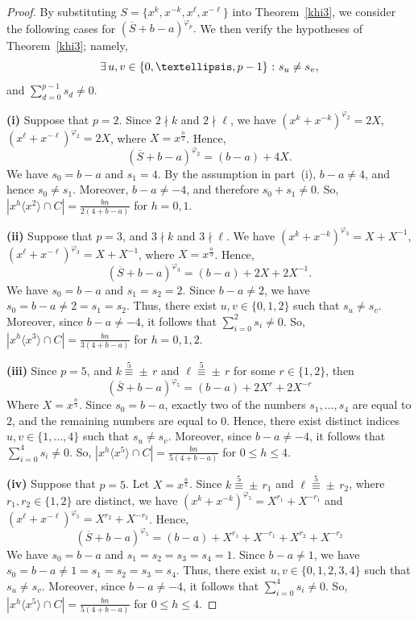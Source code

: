 \documentclass[10pt,a4paper]{amsart}
\begin{document}
\begin{proof}
	By substituting
	$
	S=\{x^k,x^{-k},x^\ell,x^{-\ell}\}
	$
	into Theorem~\ref{khi3}, we consider the following cases for
	$
	(\overline{S}+b-a)^{\varphi_p}.
	$ We then verify the hypotheses of Theorem~\ref{khi3}; namely,
		\begin{equation}\label{eq:susv2}
		\exists\,u,v\in\{0,\ldots,p-1\}\ \text : \ s_u \neq s_v, \end{equation}
	and $\sum_{d=0}^{p-1}s_d\neq0.$	
	
	\indent\textbf{(i)} Suppose that \(p=2\). Since $2\nmid k$ and $2\nmid \ell$, we have $(x^k+x^{-k})^{\varphi_2}=2X$,  $(x^\ell+x^{-\ell})^{\varphi_2}=2X$, where $X=x^\frac{n}{2}$. Hence,
	\[
	(\overline{S}+b-a)^{\varphi_2}=(b-a)+4X.
	\]
We have
$s_0=b-a$ and $s_1=4.$
By the assumption in part~(i), \(b-a\neq 4\), and hence
$s_0\neq s_1.$
Moreover, \(b-a\neq -4\), and therefore $s_0+s_1\neq 0.$ So,
$
\left|x^h\langle x^2\rangle\cap C\right|
=
\frac{bn}{2(4+b-a)}$ for $h=0,1.$

\indent\textbf{(ii)} Suppose that \(p=3\), and $3\nmid k$ and $3\nmid \ell$. We have $(x^k+x^{-k})^{\varphi_3}=X+X^{-1}$, $(x^\ell+x^{-\ell})^{\varphi_3}=X+X^{-1}$, where $X=x^\frac{n}{3}$. Hence,
\[
(\overline{S}+b-a)^{\varphi_3}=(b-a)+2X+2X^{-1}.
\]	
We have
$s_0=b-a$ and $s_1=s_2=2.$ Since \(b-a\neq 2\), we have \(s_0=b-a\neq2=s_1=s_2\). Thus, there exist \(u,v\in\{0,1,2\}\) such that \(s_u\neq s_v\). Moreover, since \(b-a\neq -4\), it follows that \(\sum_{i=0}^{2}s_i\neq 0\).
So, $
\left|x^h\langle x^3\rangle\cap C\right|
=
\frac{bn}{3(4+b-a)}$ for $h=0,1,2.$   	

\indent\textbf{(iii)} Since $p=5$, and $k\stackrel{5}{\equiv} \pm\, r$ and   $\ell\stackrel{5}{\equiv} \pm\, r$ for some $r\in\{1,2\}$, then
\[
(\overline{S}+b-a)^{\varphi_5}=(b-a)+2X^{r}+2X^{-r}
\]
 Where $X=x^\frac{n}{5}$. Since $s_0=b-a$, exactly two of the numbers $s_1,\ldots,s_{4}$ are equal to $2$, and the remaining numbers are equal to $0$. Hence, there exist distinct indices $u,v\in\{1,\ldots,4\}$ such that $s_u\neq s_v$. Moreover, since \(b-a\neq -4\), it follows that \(\sum_{i=0}^{4}s_i\neq 0\).
So, $
\left|x^h\langle x^5\rangle\cap C\right|
=
\frac{bn}{5(4+b-a)}$ for $0\le h\le 4$.

\indent\textbf{(iv)} Suppose that $p=5$. Let $X=x^\frac{n}{5}$. Since $k\stackrel{5}{\equiv} \pm\, r_1$ and $\ell\stackrel{5}{\equiv} \pm\, r_2$, where $r_1,r_2\in\{1,2\}$ are distinct, we have $(x^k+x^{-k})^{\varphi_5}=X^{r_1}+X^{-r_1}$ and $(x^\ell+x^{-\ell})^{\varphi_5}=X^{r_2}+X^{-r_2}$. Hence,
\[
(\overline{S}+b-a)^{\varphi_5}
=(b-a)+X^{r_1}+X^{-r_1}+X^{r_2}+X^{-r_2}
\]
We have
$s_0=b-a$ and $s_1=s_2=s_3=s_4=1.$ Since \(b-a\neq 1\), we have \(s_0=b-a\neq1=s_1=s_2=s_3=s_4\). Thus, there exist \(u,v\in\{0,1,2,3,4\}\) such that \(s_u\neq s_v\).  Moreover, since \(b-a\neq -4\), it follows that \(\sum_{i=0}^{4}s_i\neq 0\).
So, $
\left|x^h\langle x^5\rangle\cap C\right|
=
\frac{bn}{5(4+b-a)}$ for $0\le h\le 4$.


\end{proof}
\end{document}
